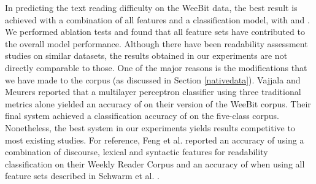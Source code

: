 \documentclass[11pt,letterpaper]{article}
\begin{document}
			\begin{table}[t]
				\centering
				\small
				\caption{Classification and ranking results on the WeeBit corpus with feature sets grouped by their type}
			    \label{individual_result}
			\end{table}
			
	In predicting the text reading difficulty on the WeeBit data, the best result is achieved with a combination of all features and a classification model, with  and . We performed ablation tests and found that all feature sets have contributed to the overall model performance. Although there have been readability assessment studies on similar datasets, the results obtained in our experiments are not directly comparable to those. One of the major reasons is the modifications that we have made to the corpus (as discussed in Section \ref{nativedata}). Vajjala and Meurers  reported that a multilayer perceptron classifier using three traditional metrics alone yielded an accuracy of  on their version of the WeeBit corpus. Their final system achieved a classification accuracy of  on the five-class corpus. Nonetheless, the best system in our experiments yields results competitive to most existing studies. For reference, Feng et al.  reported an accuracy of  using a combination of discourse, lexical and syntactic features for readability classification on their Weekly Reader Corpus and an accuracy of  when using all feature sets described in Schwarm et al. .
	
\end{document}
